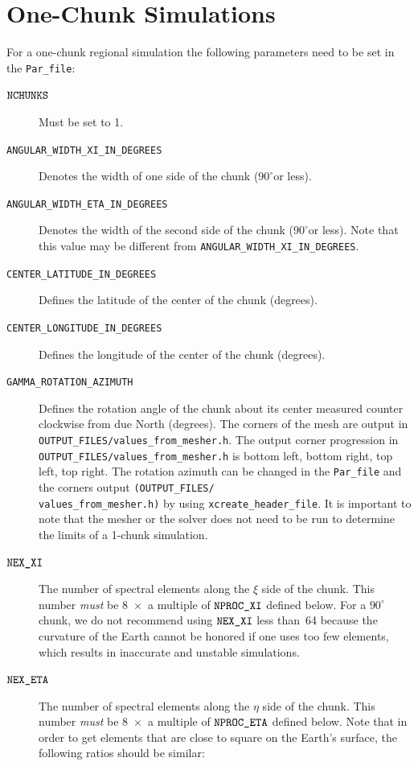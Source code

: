 \documentclass[oneside,english]{book}
\newcommand{\nexxi}{\mbox{\texttt{NEX\_XI}}}
\newcommand{\nexeta}{\mbox{\texttt{NEX\_ETA}}}
\newcommand{\nprocxi}{\mbox{\texttt{NPROC\_XI}}}
\newcommand{\nproceta}{\mbox{\texttt{NPROC\_ETA}}}
\newcommand{\nchunks}{\mbox{\texttt{NCHUNKS}}}
\begin{document}
\section{One-Chunk Simulations\label{sec:One-Chunk-Simulations}}

For a one-chunk regional simulation the following parameters need
to be set in the \texttt{Par\_file}:

\begin{description}
\item [{$\nchunks$}] Must be set to 1.
\item [{\texttt{ANGULAR\_WIDTH\_XI\_IN\_DEGREES}}] Denotes the width of
one side of the chunk ($90^{\circ}$or less).
\item [{\texttt{ANGULAR\_WIDTH\_ETA\_IN\_DEGREES}}] Denotes the width of
the second side of the chunk ($90^{\circ}$or less). Note that this
value may be different from \texttt{ANGULAR\_WIDTH\_XI\_IN\_DEGREES}.
\item [{\texttt{CENTER\_LATITUDE\_IN\_DEGREES}}] Defines the latitude of
the center of the chunk (degrees).
\item [{\texttt{CENTER\_LONGITUDE\_IN\_DEGREES}}] Defines the longitude
of the center of the chunk (degrees).
\item [{\texttt{GAMMA\_ROTATION\_AZIMUTH}}] Defines the rotation angle
of the chunk about its center measured counter clockwise from due
North (degrees). The corners of the mesh are output in \texttt{\small OUTPUT\_FILES/values\_from\_mesher.h}.
The output corner progression in \texttt{\small OUTPUT\_FILES/values\_from\_mesher.h}
is bottom left, bottom right, top left, top right. The rotation azimuth
can be changed in the \texttt{Par\_file} and the corners output \texttt{(}\texttt{\small OUTPUT\_FILES/}~\\
\texttt{\small values\_from\_mesher.h}\texttt{)} by using{\small{}
}\texttt{\small xcreate\_header\_file}. It is important to note that
the mesher or the solver does not need to be run to determine the
limits of a 1-chunk simulation.
\item [{$\nexxi$}] The number of spectral elements along the $\xi$ side
of the chunk. This number \textit{must} be 8~$\times$~a multiple
of $\nprocxi$ defined below. For a $90^{\circ}$ chunk, we do not
recommend using $\nexxi$ less than~64 because the curvature of the
Earth cannot be honored if one uses too few elements, which results
in inaccurate and unstable simulations.
\item [{$\nexeta$}] The number of spectral elements along the $\eta$
side of the chunk. This number \textit{must} be 8~$\times$~a multiple
of $\nproceta$ defined below. Note that in order to get elements
that are close to square on the Earth's surface, the following ratios
should be similar:


\end{description}
\end{document}
